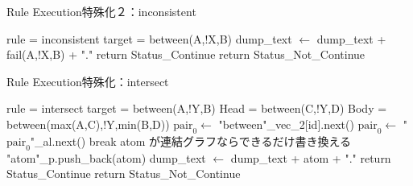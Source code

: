 \begin{algorithm}
    \caption{Rule Execution特殊化２：inconsistent}
\begin{algorithmic}
    \scriptsize
    \Require rule = inconsistent
    \Require target = between(A,!X,B)
            \State dump\_text $\gets$ dump\_text + fail(A,!X,B) + "."
            \State return Status\_Continue
        \EndIf
        \State return Status\_Not\_Continue
    \EndProcedure
\end{algorithmic}
\end{algorithm}

\begin{algorithm}
    \caption{Rule Execution特殊化：intersect}
\begin{algorithmic}
    \scriptsize
    \Require rule = intersect
    \Require target = between(A,!Y,B) 
    \Require Head = {between(C,!Y,D)}
    \Require Body = {between(max(A,C),!Y,min(B,D))}
             
                \State $\text{pair}_0 \gets$ "between"\_vec\_2[id].next() 
            \Else
                \State $\text{pair}_0 \gets$ "$\text{pair}_0$"\_al.next()
            \EndIf
             
                \State break
            \EndIf
                    \State atom が連結グラフならできるだけ書き換える
                     
                        \State "atom"\_p.push\_back(atom) 
                    \Else {}
                        \State dump\_text $\gets$ dump\_text + atom + "."
                    \EndIf
                \EndFor
                    \State return Status\_Continue
                \EndIf
            \EndIf
        \EndWhile
        \State return Status\_Not\_Continue
    \EndProcedure
\end{algorithmic}
\end{algorithm}

